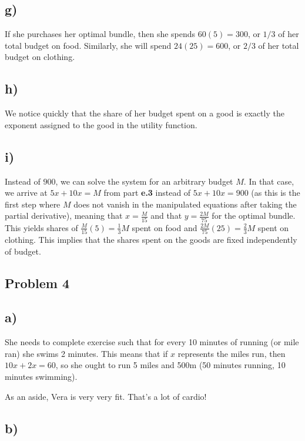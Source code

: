 \documentclass[12pt,letterpaper]{article}
\theoremstyle{definition}
\begin{document}
\subsection*{g)}

If she purchases her optimal bundle, then she spends $60(5) = 300$, or $1/3$ of her total budget on food. Similarly, she will spend $24(25) = 600$, or $2/3$ of her total budget on clothing.

\subsection*{h)} 

We notice quickly that the share of her budget spent on a good is exactly the exponent assigned to the good in the utility function.

\subsection*{i)}

Instead of $900$, we can solve the system for an arbitrary budget $M$. In that case, we arrive at $5x + 10x = M$ from part \textbf{e.3} instead of $5x + 10x = 900$ (as this is the first step where $M$ does not vanish in the manipulated equations after taking the partial derivative), meaning that $x = \frac{M}{15}$ and that $y = \frac{2M}{75}$ for the optimal bundle. This yields shares of $\frac{M}{15}(5) = \frac{1}{3}M$ spent on food and $\frac{2M}{75}(25) = \frac{2}{3}M$ spent on clothing. This implies that the shares spent on the goods are fixed independently of budget.

\subsection*{Problem 4}

\subsection*{a)}
She needs to complete exercise such that for every 10 minutes of running (or mile ran) she swims 2 minutes. This means that if $x$ represents the miles run, then $10x + 2x = 60$, so she ought to run 5 miles and 500m (50 minutes running, 10 minutes swimming).

As an aside, Vera is very very fit. That's a lot of cardio!

\subsection*{b)}
\end{document}

